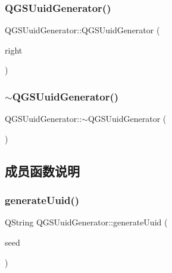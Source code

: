 \subsubsection{\texorpdfstring{Q\+G\+S\+Uuid\+Generator()}{QGSUuidGenerator()}\hspace{0.1cm}{\footnotesize\ttfamily [3/3]}}
{\footnotesize\ttfamily Q\+G\+S\+Uuid\+Generator\+::\+Q\+G\+S\+Uuid\+Generator (\begin{DoxyParamCaption}\item[{\mbox{\hyperlink{class_q_g_s_uuid_generator}{Q\+G\+S\+Uuid\+Generator}} \&\&}]{right }\end{DoxyParamCaption})\hspace{0.3cm}{\ttfamily [delete]}}

\mbox{\label{class_q_g_s_uuid_generator_a8bb4c1fbb65cd4f3692cc6a4b28a341c}} 
\subsubsection{\texorpdfstring{$\sim$\+Q\+G\+S\+Uuid\+Generator()}{~QGSUuidGenerator()}}
{\footnotesize\ttfamily Q\+G\+S\+Uuid\+Generator\+::$\sim$\+Q\+G\+S\+Uuid\+Generator (\begin{DoxyParamCaption}{ }\end{DoxyParamCaption})\hspace{0.3cm}{\ttfamily [virtual]}}



\subsection{成员函数说明}
\mbox{\label{class_q_g_s_uuid_generator_a09a392a6d976babf2976806357fc3b9d}} 
\subsubsection{\texorpdfstring{generate\+Uuid()}{generateUuid()}\hspace{0.1cm}{\footnotesize\ttfamily [1/2]}}
{\footnotesize\ttfamily Q\+String Q\+G\+S\+Uuid\+Generator\+::generate\+Uuid (\begin{DoxyParamCaption}\item[{const Q\+String \&}]{seed }\end{DoxyParamCaption})\hspace{0.3cm}{\ttfamily [static]}}

